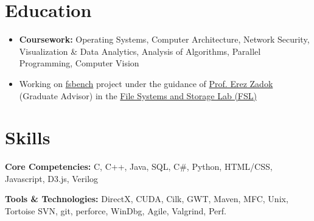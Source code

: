 \documentclass[10pt,a4paper,sans]{moderncv}        %
\begin{document}
\makecvtitle
\vspace{-1cm}
\section{Education}
{
\begin{itemize}
\item \textbf{Coursework:} Operating Systems, Computer Architecture, Network Security, Visualization \& Data Analytics, Analysis of Algorithms, Parallel Programming, Computer Vision
\item Working on \uline{fsbench} project under the guidance of \uline{Prof. Erez Zadok} (Graduate Advisor) in the \uline{File
Systems and Storage Lab (FSL)}
\end{itemize}
\vspace{3pt}
{
}
\section{Skills}

\vspace{3pt}

\textbf{Core Competencies:} C, C++, Java, SQL, C\#, Python, HTML/CSS, Javascript, D3.js, Verilog
\vspace{3pt}

\textbf{Tools \& Technologies:} DirectX, CUDA, Cilk, GWT, Maven, MFC, Unix, Tortoise SVN, git, perforce, WinDbg, Agile, Valgrind, Perf.


}
\end{document}
